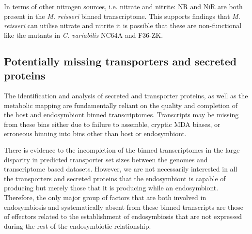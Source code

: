 %
%

In terms of other nitrogen sources, i.e. nitrate and nitrite:
NR and NiR are both present in the \textit{M. reisseri} binned transcriptome.
This supports findings that \textit{M. reisseri} can utilise nitrate and nitrite
it is possible that these are non-functional like the mutants in 
\textit{C. variabilis} NC64A and F36-ZK.


\subsection{Potentially missing transporters and secreted proteins}

The identification and analysis of secreted and transporter proteins,
as well as the metabolic mapping are fundamentally reliant on the quality and completion
of the host and endosymbiont binned transcriptomes. 
Transcripts may be missing from these bins either due to failure to assemble, 
cryptic MDA biases, or erroneous binning into bins other than host or endosymbiont.

There is evidence to the incompletion of the binned transcriptomes in the large
disparity in predicted transporter set sizes between the genomes and transcriptome
based datasets.  However,
we are not necessarily interested in all the transporters and secreted proteins
that the endosymbiont is capable of producing but merely those that it is producing
while an endosymbiont. Therefore, the only major group of factors that are both
involved in endosymbiosis and systematically absent from these binned
transcripts are those of effectors related to the establishment of endosymbiosis
that are not expressed during the rest of the endosymbiotic relationship.


